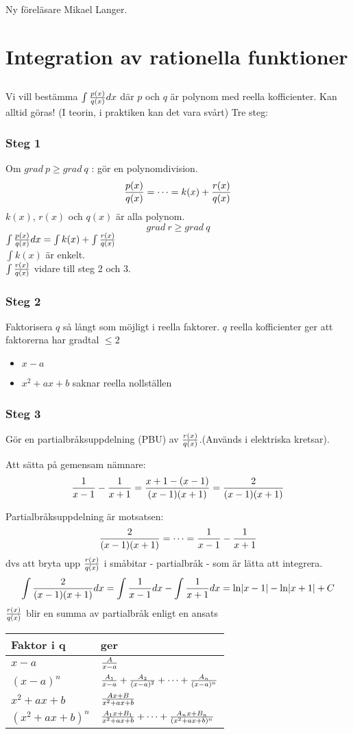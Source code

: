 \documentclass{article}
\newcommand{\xa}{x-a}
\newcommand{\xan}[1]{(\xa)^{#1}}
\newcommand{\xab}{x^2+ax+b}
\newcommand{\xabn}[1]{(\xab)^{#1}}
\begin{document}
Ny föreläsare Mikael Langer.
\section{Integration av rationella funktioner}
\subsection{}
Vi vill bestämma $\int{\frac{p(x)}{q(x)}dx}$ där $p$ och $q$ är polynom med reella kofficienter.
Kan alltid göras! (I teorin, i praktiken kan det vara svårt) Tre steg:

\subsubsection{Steg 1}
Om $grad\ p \ge grad\ q$ : gör en polynomdivision.
$$ \frac{p(x)}{q(x)} = \cdots = k(x) + \frac{r(x)}{q(x)}$$
$k(x)$, $r(x)$ och $q(x)$ är alla polynom.
$$grad\ r \ge grad\ q$$
$\int{\frac{p(x)}{q(x)}dx} = \int{k(x)}+\int{\frac{r(x)}{q(x)}}$\\
$\int{k(x)}$ är enkelt.\\
$\int{\frac{r(x)}{q(x)}}$ vidare till steg 2 och 3.

\subsubsection{Steg 2}
Faktorisera $q$ så långt som möjligt i reella faktorer.
$q$ reella kofficienter ger att faktorerna har gradtal $\le 2$
\begin{itemize}
    \item $\xa$
    \item $\xab$ saknar reella nollställen
\end{itemize}

\subsubsection{Steg 3}
Gör en partialbråksuppdelning (PBU) av $\frac{r(x)}{q(x)}$.(Används i elektriska kretsar).

Att sätta på gemensam nämnare:
$$ \frac{1}{x-1}-\frac{1}{x+1}=\frac{x+1-(x-1)}{(x-1)(x+1)}=\frac{2}{(x-1)(x+1)} $$

Partialbråksuppdelning är motsatsen:
$$ \frac{2}{(x-1)(x+1)}=\cdots= \frac{1}{x-1}-\frac{1}{x+1}$$
dvs att bryta upp $\frac{r(x)}{q(x)}$ i småbitar - partialbråk - som är lätta att integrera.
$$\int{\frac{2}{(x-1)(x+1)}dx} = \int{\frac{1}{x-1}dx} - \int{\frac{1}{x+1}dx} = \ln\lvert x-1\rvert - \ln\lvert x+1\rvert + C$$
$\frac{r(x)}{q(x)}$ blir en summa av partialbråk enligt en ansats

\begin{tabular}{ l l }
  Faktor i q & ger \\\hline
  $\xa$ & $\f{A}{\xa}$\\
  $\xan{n}$ & $\f{A_1}{\xa}+\f{A_2}{\xan{2}}+\cdots+\f{A_n}{\xan{n}}$\\
  $\xab$ & $\f{Ax+B}{\xab}$\\
  $\xabn{n}$ & $\f{A_1x+B_1}{\xab}+\cdots+\f{A_nx+B_n}{\xabn{n}}$\\
\end{tabular}
\end{document}
